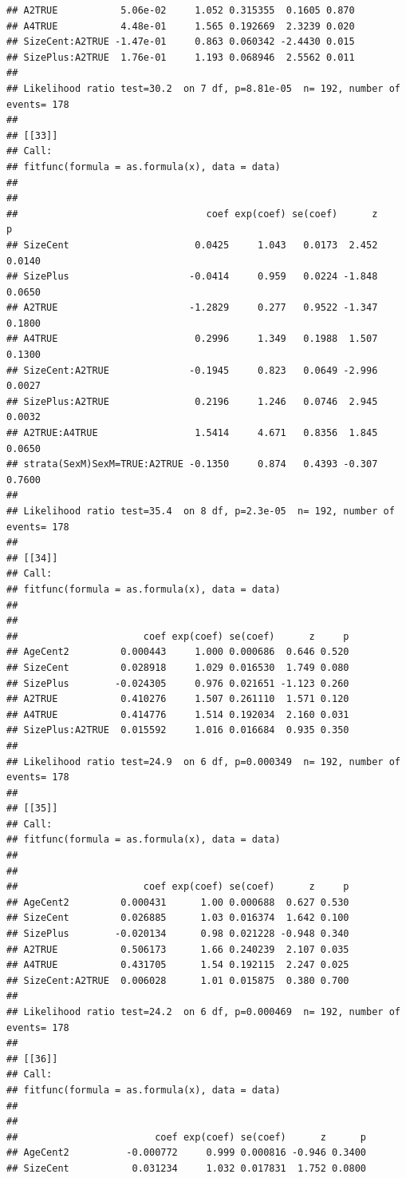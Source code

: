 \documentclass{article}\usepackage[]{graphicx}\usepackage[]{color}
\makeatletter
\newenvironment{kframe}{%
 \def\at@end@of@kframe{}%
 \ifinner\ifhmode%
  \def\at@end@of@kframe{\end{minipage}}%
  \begin{minipage}{\columnwidth}%
 \fi\fi%
 \def\FrameCommand##1{\hskip\@totalleftmargin \hskip-\fboxsep
 \colorbox{shadecolor}{##1}\hskip-\fboxsep
     \hskip-\linewidth \hskip-\@totalleftmargin \hskip\columnwidth}%
 \MakeFramed {\advance\hsize-\width
   \@totalleftmargin\z@ \linewidth\hsize
   \@setminipage}}%
 {\par\unskip\endMakeFramed%
 \at@end@of@kframe}
\newenvironment{knitrout}{}{} %
\makeatother
\begin{document}
\begin{knitrout}
\begin{kframe}
\begin{verbatim}
## A2TRUE           5.06e-02     1.052 0.315355  0.1605 0.870
## A4TRUE           4.48e-01     1.565 0.192669  2.3239 0.020
## SizeCent:A2TRUE -1.47e-01     0.863 0.060342 -2.4430 0.015
## SizePlus:A2TRUE  1.76e-01     1.193 0.068946  2.5562 0.011
## 
## Likelihood ratio test=30.2  on 7 df, p=8.81e-05  n= 192, number of events= 178 
## 
## [[33]]
## Call:
## fitfunc(formula = as.formula(x), data = data)
## 
## 
##                                 coef exp(coef) se(coef)      z      p
## SizeCent                      0.0425     1.043   0.0173  2.452 0.0140
## SizePlus                     -0.0414     0.959   0.0224 -1.848 0.0650
## A2TRUE                       -1.2829     0.277   0.9522 -1.347 0.1800
## A4TRUE                        0.2996     1.349   0.1988  1.507 0.1300
## SizeCent:A2TRUE              -0.1945     0.823   0.0649 -2.996 0.0027
## SizePlus:A2TRUE               0.2196     1.246   0.0746  2.945 0.0032
## A2TRUE:A4TRUE                 1.5414     4.671   0.8356  1.845 0.0650
## strata(SexM)SexM=TRUE:A2TRUE -0.1350     0.874   0.4393 -0.307 0.7600
## 
## Likelihood ratio test=35.4  on 8 df, p=2.3e-05  n= 192, number of events= 178 
## 
## [[34]]
## Call:
## fitfunc(formula = as.formula(x), data = data)
## 
## 
##                      coef exp(coef) se(coef)      z     p
## AgeCent2         0.000443     1.000 0.000686  0.646 0.520
## SizeCent         0.028918     1.029 0.016530  1.749 0.080
## SizePlus        -0.024305     0.976 0.021651 -1.123 0.260
## A2TRUE           0.410276     1.507 0.261110  1.571 0.120
## A4TRUE           0.414776     1.514 0.192034  2.160 0.031
## SizePlus:A2TRUE  0.015592     1.016 0.016684  0.935 0.350
## 
## Likelihood ratio test=24.9  on 6 df, p=0.000349  n= 192, number of events= 178 
## 
## [[35]]
## Call:
## fitfunc(formula = as.formula(x), data = data)
## 
## 
##                      coef exp(coef) se(coef)      z     p
## AgeCent2         0.000431      1.00 0.000688  0.627 0.530
## SizeCent         0.026885      1.03 0.016374  1.642 0.100
## SizePlus        -0.020134      0.98 0.021228 -0.948 0.340
## A2TRUE           0.506173      1.66 0.240239  2.107 0.035
## A4TRUE           0.431705      1.54 0.192115  2.247 0.025
## SizeCent:A2TRUE  0.006028      1.01 0.015875  0.380 0.700
## 
## Likelihood ratio test=24.2  on 6 df, p=0.000469  n= 192, number of events= 178 
## 
## [[36]]
## Call:
## fitfunc(formula = as.formula(x), data = data)
## 
## 
##                        coef exp(coef) se(coef)      z      p
## AgeCent2          -0.000772     0.999 0.000816 -0.946 0.3400
## SizeCent           0.031234     1.032 0.017831  1.752 0.0800

\end{verbatim}
\end{kframe}
\end{knitrout}
\end{document}
